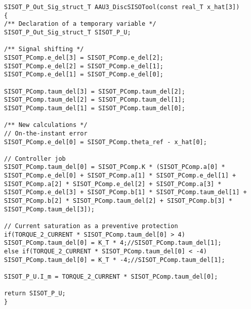 \begin{lstlisting}[style=customcpp,
caption={Code for the implementation of the controller designed from root locus in C\texttt{++}.}, 
label=lst:codeSISOTController]
SISOT_P_Out_Sig_struct_T AAU3_DiscSISOTool(const real_T x_hat[3])
{
/** Declaration of a temporary variable */
SISOT_P_Out_Sig_struct_T SISOT_P_U;

/** Signal shifting */
SISOT_PComp.e_del[3] = SISOT_PComp.e_del[2];
SISOT_PComp.e_del[2] = SISOT_PComp.e_del[1];
SISOT_PComp.e_del[1] = SISOT_PComp.e_del[0];

SISOT_PComp.taum_del[3] = SISOT_PComp.taum_del[2];
SISOT_PComp.taum_del[2] = SISOT_PComp.taum_del[1];
SISOT_PComp.taum_del[1] = SISOT_PComp.taum_del[0];

/** New calculations */
// On-the-instant error
SISOT_PComp.e_del[0] = SISOT_PComp.theta_ref - x_hat[0]; 

// Controller job
SISOT_PComp.taum_del[0] = SISOT_PComp.K * (SISOT_PComp.a[0] * SISOT_PComp.e_del[0] + SISOT_PComp.a[1] * SISOT_PComp.e_del[1] + SISOT_PComp.a[2] * SISOT_PComp.e_del[2] + SISOT_PComp.a[3] * SISOT_PComp.e_del[3] + SISOT_PComp.b[1] * SISOT_PComp.taum_del[1] + SISOT_PComp.b[2] * SISOT_PComp.taum_del[2] + SISOT_PComp.b[3] * SISOT_PComp.taum_del[3]);

// Current saturation as a preventive protection
if(TORQUE_2_CURRENT * SISOT_PComp.taum_del[0] > 4)
SISOT_PComp.taum_del[0] = K_T * 4;//SISOT_PComp.taum_del[1];
else if(TORQUE_2_CURRENT * SISOT_PComp.taum_del[0] < -4)
SISOT_PComp.taum_del[0] = K_T * -4;//SISOT_PComp.taum_del[1];

SISOT_P_U.I_m = TORQUE_2_CURRENT * SISOT_PComp.taum_del[0];

return SISOT_P_U;
}
\end{lstlisting}